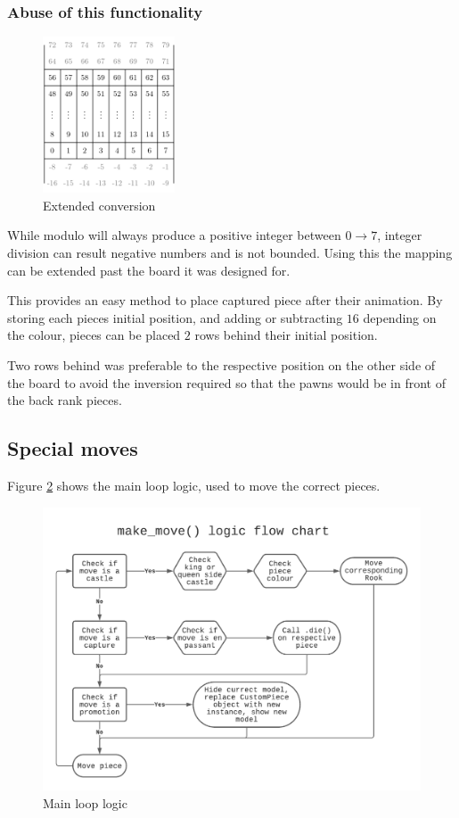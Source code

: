 \documentclass[11pt]{article}
\begin{document}
\subsubsection{Abuse of this functionality}
\label{sec:org3bb3002}
\begin{figure}
\centering
\includegraphics[width=0.35\textwidth]{Images/tikzit_image0.png}
\caption{\label{extended-array}Extended conversion}
\end{figure}

While modulo will always produce a positive integer between \(0 \to 7\), integer
division can result negative numbers and is not bounded. Using this the mapping
can be extended past the board it was designed for.

This provides an easy method to place captured piece after their animation. By
storing each pieces initial position, and adding or subtracting \(16\) depending on
the colour, pieces can be placed \(2\) rows behind their initial position.

Two rows behind was preferable to the respective position on the other side of
the board to avoid the inversion required so that the pawns would be in front of the
back rank pieces.

\newpage
\subsection{Special moves}
\label{sec:org0d3d549}
Figure \ref{flowchart} shows the main loop logic, used to move the correct pieces.
\begin{figure}[htbp]
\centering
\includegraphics[width=\textwidth]{flowchart.pdf}
\caption{\label{flowchart}Main loop logic}
\end{figure}
\end{document}
